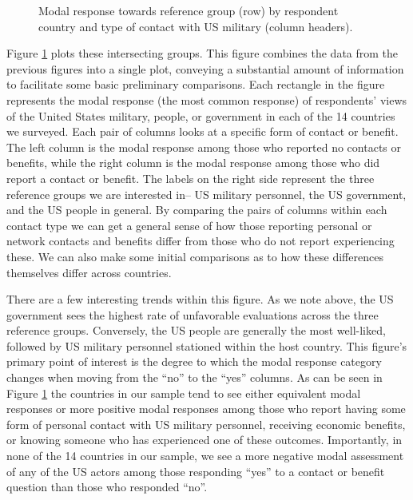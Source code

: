 \begin{figure}[t]
	\centering{}
	\caption{Modal response towards reference group (row) by respondent country and type of contact with US military (column headers).}
	\label{fig:tileplot}
\end{figure}%

Figure \ref{fig:tileplot} plots these intersecting groups. This figure combines the data from the previous figures into a single plot, conveying a substantial amount of information to facilitate some basic preliminary comparisons. Each rectangle in the figure represents the modal response (the most common response) of respondents' views of the United States military, people, or government in each of the 14 countries we surveyed. Each pair of columns looks at a specific form of contact or benefit. The left column is the modal response among those who reported no contacts or benefits, while the right column is the modal response among those who did report a contact or benefit. The labels on the right side represent the three reference groups we are interested in-- US military personnel, the US government, and the US people in general. By comparing the pairs of columns within each contact type we can get a general sense of how those reporting personal or network contacts and benefits differ from those who do not report experiencing these. We can also make some initial comparisons as to how these differences themselves differ across countries.  

There are a few interesting trends within this figure. As we note above, the US government sees the highest rate of unfavorable evaluations across the three reference groups. Conversely, the US people are generally the most well-liked, followed by US military personnel stationed within the host country. This figure's primary point of interest is the degree to which the modal response category changes when moving from the ``no'' to the ``yes'' columns. As can be seen in Figure \ref{fig:tileplot} the countries in our sample tend to see either equivalent modal responses or more positive modal responses among those who report having some form of personal contact with US military personnel, receiving economic benefits, or knowing someone who has experienced one of these outcomes. Importantly, in none of the 14 countries in our sample, we see a more negative modal assessment of any of the US actors among those responding ``yes'' to a contact or benefit question than those who responded ``no''. 

